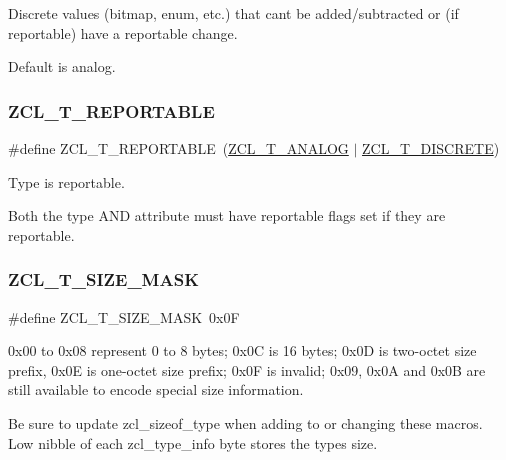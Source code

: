 Discrete values (bitmap, enum, etc.) that can\textquotesingle{}t be added/subtracted or (if reportable) have a reportable change. 

Default is analog. \mbox{\label{group__zcl__types_gab0e5c23a0877c17fde12043c85728c29}} 
\subsubsection{\texorpdfstring{Z\+C\+L\+\_\+\+T\+\_\+\+R\+E\+P\+O\+R\+T\+A\+B\+LE}{ZCL\_T\_REPORTABLE}}
{\footnotesize\ttfamily \#define Z\+C\+L\+\_\+\+T\+\_\+\+R\+E\+P\+O\+R\+T\+A\+B\+LE~(\hyperlink{group__zcl__types_ga7b609984d4662f83a2248d1f485fd4ad}{Z\+C\+L\+\_\+\+T\+\_\+\+A\+N\+A\+L\+OG} $\vert$ \hyperlink{group__zcl__types_ga3e9bf95af4f58a0c9c5c34639b0dda29}{Z\+C\+L\+\_\+\+T\+\_\+\+D\+I\+S\+C\+R\+E\+TE})}



Type is reportable. 

Both the type A\+ND attribute must have reportable flags set if they are reportable. \mbox{\label{group__zcl__types_gaa49518f03f9632a55b3e1c4d4c68b60c}} 
\subsubsection{\texorpdfstring{Z\+C\+L\+\_\+\+T\+\_\+\+S\+I\+Z\+E\+\_\+\+M\+A\+SK}{ZCL\_T\_SIZE\_MASK}}
{\footnotesize\ttfamily \#define Z\+C\+L\+\_\+\+T\+\_\+\+S\+I\+Z\+E\+\_\+\+M\+A\+SK~0x0F}



0x00 to 0x08 represent 0 to 8 bytes; 0x0C is 16 bytes; 0x0D is two-\/octet size prefix, 0x0E is one-\/octet size prefix; 0x0F is invalid; 0x09, 0x0A and 0x0B are still available to encode special size information. 

Be sure to update zcl\+\_\+sizeof\+\_\+type when adding to or changing these macros. Low nibble of each zcl\+\_\+type\+\_\+info byte stores the type\textquotesingle{}s size. 


